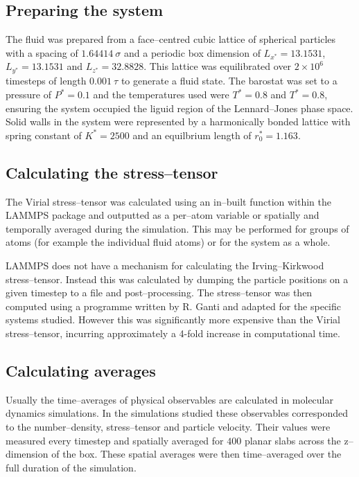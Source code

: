 \subsection{Preparing the system}
The fluid was prepared from a face--centred cubic lattice of spherical particles with a spacing of $1.64414\ \sigma$ and a periodic box dimension of $L_{x^{*}}=13.1531$, $L_{y^{*}}=13.1531$ and $L_{z^{*}}=32.8828$.
This lattice was equilibrated over $2\times 10^{6}$ timesteps of length $0.001\ \tau$ to generate a fluid state.
The barostat was set to a pressure of $P^{*} = 0.1$ and the temperatures used were $T^{*} = 0.8$ and $T^{*} = 0.8$, ensuring the system occupied the liguid region of the Lennard--Jones phase space.\cite{Smit}
Solid walls in the system were represented by a harmonically bonded lattice with spring constant of $K^{*} = 2500$ and an equilbrium length of $r^{*}_{0}=1.163$.

\subsection{Calculating the stress--tensor}\label{CalcStress}
The Virial stress--tensor was calculated using an in--built function within the LAMMPS package and outputted as a per--atom variable or spatially and temporally averaged during the simulation.
This may be performed for groups of atoms (for example the individual fluid atoms) or for the system as a whole.

LAMMPS does not have a mechanism for calculating the Irving--Kirkwood stress--tensor.
Instead this was calculated by dumping the particle positions on a given timestep to a file and post--processing.
The stress--tensor was then computed using a programme written by R. Ganti and adapted for the specific systems studied.
However this was significantly more expensive than the Virial stress--tensor, incurring approximately a 4-fold increase in computational time.

\subsection{Calculating averages}
Usually the time--averages of physical observables are calculated in molecular dynamics simulations. 
In the simulations studied these observables corresponded to the number--density, stress--tensor and particle velocity.
Their values were measured every timestep and spatially averaged for $400$ planar slabs across the z--dimension of the box.
These spatial averages were then time--averaged over the full duration of the simulation.

